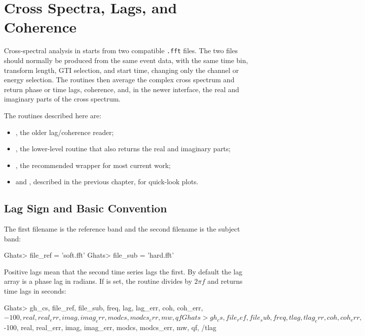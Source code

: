 \chapter{Cross Spectra, Lags, and Coherence}

Cross-spectral analysis in \ghats{} starts from two compatible
\texttt{.fft} files.  The two files should normally be produced from the
same event data, with the same time bin, transform length, GTI selection,
and start time, changing only the channel or energy selection.  The routines
then average the complex cross spectrum and return phase or time lags,
coherence, and, in the newer interface, the real and imaginary parts of the
cross spectrum.

The routines described here are:

\begin{itemize}
\item {}, the older lag/coherence reader;
\item {}, the lower-level routine that also
  returns the real and imaginary parts;
\item {}, the recommended wrapper for most current work;
\item {} and , described in the
  previous chapter, for quick-look plots.
\end{itemize}

\section{Lag Sign and Basic Convention}

The first filename is the reference band and the second filename is the
subject band:

\begin{ghatsconsole}
Ghats> file_ref = 'soft.fft'
Ghats> file_sub = 'hard.fft'
\end{ghatsconsole}

Positive lags mean that the second time series lags the first.  By default
the lag array is a phase lag in radians.  If  is set, the
routine divides by \(2\pi f\) and returns time lags in seconds:

\begin{ghatsconsole}
Ghats> gh_cs, file_ref, file_sub, freq, lag, lag_err, coh, coh_err, $
       -100, real, real_err, imag, imag_err, modcs, modcs_err, mw, qf

Ghats> gh_cs, file_ref, file_sub, freq, tlag, tlag_err, coh, coh_err, $
       -100, real, real_err, imag, imag_err, modcs, modcs_err, mw, qf, /tlag
\end{ghatsconsole}


